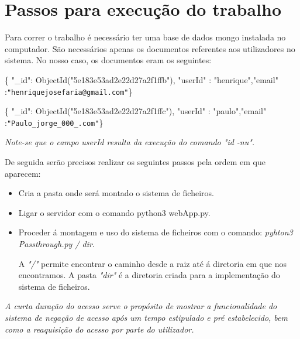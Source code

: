 \section{Passos para execução do trabalho}

 Para correr o trabalho é necessário ter uma base de dados mongo instalada no computador. São necessários apenas os documentos referentes aos utilizadores no sistema. No nosso caso, os documentos eram os seguintes:\newline


 \par \{ "\_id": ObjectId("5e183e53ad2e22d27a2f1ffb"), "userId" : "henrique",\newline "email" :\texttt{"henriquejosefaria@gmail.com"}\} \newline
 \par \{ "\_id": ObjectId("5e183e53ad2e22d27a2f1ffc"), "userId" : "paulo",\newline "email" :\texttt{"Paulo\_jorge\_000\_\@hotmail.com"}\}\newline



\par\textit{ Note-se que o campo userId resulta da execução do comando "id -nu".}\newline


\par De seguida serão precisos realizar os seguintes passos pela ordem em que aparecem:\newline


\begin{itemize}
\item Cria a pasta onde será montado o sistema de ficheiros.\newline
\item Ligar o servidor com o comando python3 webApp.py.\newline
\item Proceder á montagem e uso do sistema de ficheiros com o comando: \textit{pyhton3 Passthrough.py / dir}.\newline


A \textit{"/"} permite encontrar o caminho desde a raiz até á diretoria em que nos encontramos.\newline
A pasta \textit{"dir"} é a diretoria criada para a implementação do sistema de ficheiros.\newline
\end{itemize}

\textit{ A curta duração do acesso serve o propósito de mostrar a funcionalidade do sistema de negação de acesso após um tempo estipulado e pré estabelecido, bem como a reaquisição do acesso por parte do utilizador.} 








